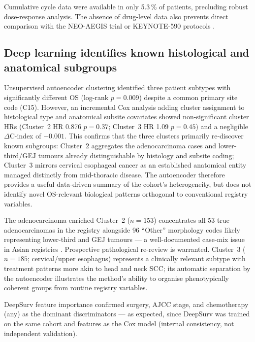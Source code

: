 \documentclass[12pt,a4paper]{article}
\begin{document}
Cumulative cycle data were available in only 5.3\,\% of patients,
precluding robust dose-response analysis. The absence of drug-level data
also prevents direct comparison with the NEO-AEGIS trial or KEYNOTE-590
protocols \cite{Shapiro2021, Sun2021}.

\subsection{Deep learning identifies known histological and anatomical subgroups}
Unsupervised autoencoder clustering identified three patient subtypes with
significantly different OS (log-rank $p = 0.009$) despite a common
primary site code (C15). However, an incremental Cox analysis adding
cluster assignment to histological type and anatomical subsite covariates
showed non-significant cluster HRs (Cluster~2 HR 0.876 $p = 0.37$;
Cluster~3 HR 1.09 $p = 0.45$) and a negligible $\Delta$C-index of
$-0.001$. This confirms that the three clusters primarily re-discover
known subgroups: Cluster~2 aggregates the adenocarcinoma cases and
lower-third/GEJ tumours already distinguishable by histology and subsite
coding; Cluster~3 mirrors cervical esophageal cancer as an established
anatomical entity managed distinctly from mid-thoracic disease. The
autoencoder therefore provides a useful data-driven summary of the
cohort's heterogeneity, but does not identify novel OS-relevant
biological patterns orthogonal to conventional registry variables.

The adenocarcinoma-enriched Cluster~2 ($n = 153$) concentrates all 53
true adenocarcinomas in the registry alongside 96 ``Other'' morphology
codes likely representing lower-third and GEJ tumours --- a well-documented
case-mix issue in Asian registries \cite{Rice2017}. Prospective pathological
re-review is warranted. Cluster~3 ($n = 185$; cervical/upper esophagus)
represents a clinically relevant subtype with treatment patterns more akin
to head and neck SCC; its automatic separation by the autoencoder
illustrates the method's ability to organise phenotypically coherent
groups from routine registry variables.

DeepSurv feature importance confirmed surgery, AJCC stage, and
chemotherapy (any) as the dominant discriminators --- as expected, since
DeepSurv was trained on the same cohort and features as the Cox model
(internal consistency, not independent validation).
\end{document}
